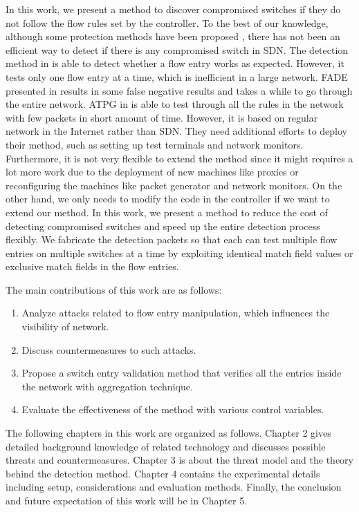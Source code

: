 In this work, we present a method to discover compromised switches if they do not follow the flow rules set by the controller. To the best of our knowledge, although some protection methods have been proposed \cite{CKGL15,PJL16}, there has not been an efficient way to detect if there is any compromised switch in SDN. The detection method in \cite{CKGL15} is able to detect whether a flow entry works as expected. However, it tests only one flow entry at a time, which is inefficient in a large network. FADE presented in \cite{PJL16} results in some false negative results and takes a while to go through the entire network. ATPG in \cite{ZKVM12} is able to test through all the rules in the network with few packets in short amount of time. However, it is based on regular network in the Internet rather than SDN. They need additional efforts to deploy their method, such as setting up test terminals and network monitors. Furthermore, it is not very flexible to extend the method since it might requires a lot more work due to the deployment of new machines like proxies or reconfiguring the machines like packet generator and network monitors. On the other hand, we only needs to modify the code in the controller if we want to extend our method. In this work, we present a method to reduce the cost of detecting compromised switches and speed up the entire detection process flexibly. We fabricate the detection packets so that each can test multiple flow entries on multiple switches at a time by exploiting identical match field values or exclusive match fields in the flow entries. 

The main contributions of this work are as follows:
\begin{enumerate}
\item
Analyze attacks related to flow entry manipulation, which influences the visibility of network.
\item
Discuss countermeasures to such attacks.
\item
Propose a switch entry validation method that verifies all the entries inside the network with aggregation technique.
\item
Evaluate the effectiveness of the method with various control variables.
\end{enumerate}

The following chapters in this work are organized as follows. Chapter 2 gives detailed background knowledge of related technology and discusses possible threats and countermeasures. Chapter 3 is about the threat model and the theory behind the detection method. Chapter 4 contains the experimental details including setup, considerations and evaluation methods. Finally, the conclusion and future expectation of this work will be in Chapter 5.